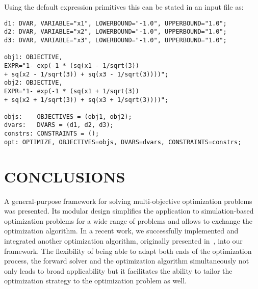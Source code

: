 \documentclass[%
reprint,
amsmath,amssymb,
aps,
prstab,
]{revtex4-1}
\begin{document}
%
Using the default expression primitives this can be stated in an input file
  as:
%

\begin{flushleft}
\begin{Verbatim}[fontsize=\scriptsize]
d1: DVAR, VARIABLE="x1", LOWERBOUND="-1.0", UPPERBOUND="1.0";
d2: DVAR, VARIABLE="x2", LOWERBOUND="-1.0", UPPERBOUND="1.0";
d3: DVAR, VARIABLE="x3", LOWERBOUND="-1.0", UPPERBOUND="1.0";

obj1: OBJECTIVE,
EXPR="1- exp(-1 * (sq(x1 - 1/sqrt(3)) 
+ sq(x2 - 1/sqrt(3)) + sq(x3 - 1/sqrt(3))))";
obj2: OBJECTIVE,
EXPR="1- exp(-1 * (sq(x1 + 1/sqrt(3)) 
+ sq(x2 + 1/sqrt(3)) + sq(x3 + 1/sqrt(3))))";

objs:    OBJECTIVES = (obj1, obj2);
dvars:   DVARS = (d1, d2, d3);
constrs: CONSTRAINTS = ();
opt: OPTIMIZE, OBJECTIVES=objs, DVARS=dvars, CONSTRAINTS=constrs;
\end{Verbatim}
\end{flushleft}



 



\section{CONCLUSIONS} \label{sec:conclusions}

A general-purpose framework for solving multi-objective
  optimization problems was presented.
Its modular design simplifies the application to simulation-based optimization
  problems for a wide range of problems and allows to exchange the
  optimization algorithm.
In a recent work, we successfully implemented and integrated another
  optimization algorithm, originally presented in~\cite{pesc:11}, into our
  framework.
The flexibility of being able to adapt both ends of the optimization
  process, the forward solver and the optimization algorithm simultaneously
  not only leads to broad applicability but it facilitates the ability to
  tailor the optimization strategy to the optimization problem as well.
\end{document}

